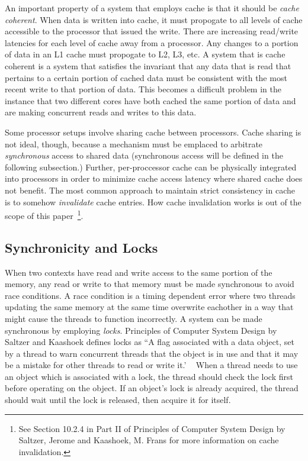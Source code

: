 \documentclass{sig-alternate}
\begin{document}
An important property of a system that employs cache is that it should be \emph{cache coherent}. When data is written into cache, it must propogate to all levels of cache accessible to the processor that issued the write. There are increasing read/write latencies for each level of cache away from a processor. Any changes to a portion of data in an L1 cache must propogate to L2, L3, etc. A system that is cache coherent is a system that satisfies the invariant that any data that is read that pertains to a certain portion of cached data must be consistent with the most recent write to that portion of data. This becomes a difficult problem in the instance that two different cores have both cached the same portion of data and are making concurrent reads and writes to this data.

Some processor setups involve sharing cache between processors. Cache sharing is not ideal, though, because a mechanism must be emplaced to arbitrate \emph{synchronous} access to shared data (synchronous access will be defined in the following subsection.) Further, per-proccessor cache can be physically integrated into processors in order to minimize cache access latency where shared cache does not benefit. The most common approach to maintain strict consistency in cache is to somehow \emph{invalidate} cache entries. How cache invalidation works is out of the scope of this paper~\footnote{See Section 10.2.4 in Part II of Principles of Computer System Design by Saltzer, Jerome and Kaashoek, M. Frans for more information on cache invalidation.}.~\cite{Systems}


\subsection{Synchronicity and Locks}
\label{sec:locks}

When two contexts have read and write access to the same portion of the memory, any read or write to that memory must be made synchronous to avoid race conditions. A race condition is a timing dependent error where two threads updating the same memory at the same time overwrite eachother in a way that might cause the threads to function incorrectly. A system can be made synchronous by employing \emph{locks}. Principles of Computer System Design by Saltzer and Kaashoek defines locks as ``A flag associated with a data object, set by a thread to warn concurrent threads that the object is in use and that it may be a mistake for other threads to read or write it.' ~\cite{Systems}
When a thread needs to use an object which is associated with a lock, the thread should check the lock first before operating on the object. If an object's lock is already acquired, the thread should wait until the lock is released, then acquire it for itself.
\end{document}
